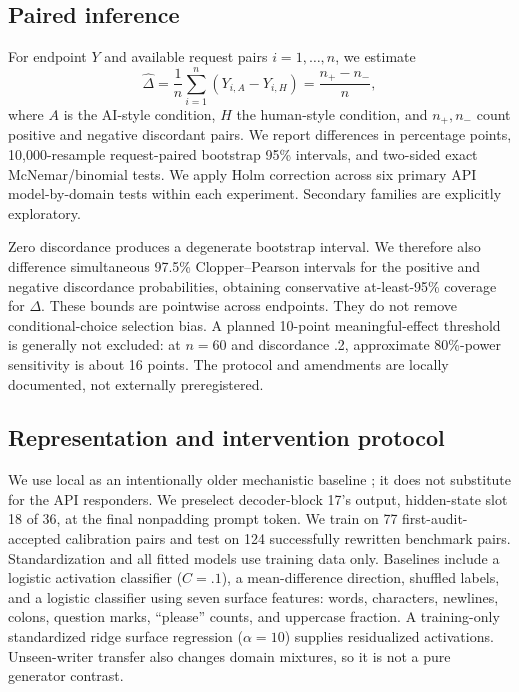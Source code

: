 \subsection{Paired inference}
For endpoint $Y$ and available request pairs $i=1,\ldots,n$, we estimate
\begin{equation}
\widehat{\Delta}=\frac{1}{n}\sum_{i=1}^{n}(Y_{i,A}-Y_{i,H})
=\frac{n_+-n_-}{n},
\label{eq:paired}
\end{equation}
where $A$ is the AI-style condition, $H$ the human-style condition, and $n_+,n_-$ count positive and negative discordant pairs. We report differences in percentage points, 10,000-resample request-paired bootstrap 95\% intervals, and two-sided exact McNemar/binomial tests. We apply Holm correction across six primary API model-by-domain tests within each experiment. Secondary families are explicitly exploratory.

Zero discordance produces a degenerate bootstrap interval. We therefore also difference simultaneous 97.5\% Clopper--Pearson intervals for the positive and negative discordance probabilities, obtaining conservative at-least-95\% coverage for $\Delta$. These bounds are pointwise across endpoints. They do not remove conditional-choice selection bias. A planned 10-point meaningful-effect threshold is generally not excluded: at $n=60$ and discordance .2, approximate 80\%-power sensitivity is about 16 points. The protocol and amendments are locally documented, not externally preregistered.

\subsection{Representation and intervention protocol}
We use local \qwenlocal as an intentionally older mechanistic baseline \cite{qwenmodel}; it does not substitute for the API responders. We preselect decoder-block 17's output, hidden-state slot 18 of 36, at the final nonpadding prompt token. We train on 77 first-audit-accepted calibration pairs and test on 124 successfully rewritten benchmark pairs. Standardization and all fitted models use training data only. Baselines include a logistic activation classifier ($C=.1$), a mean-difference direction, shuffled labels, and a logistic classifier using seven surface features: words, characters, newlines, colons, question marks, ``please'' counts, and uppercase fraction. A training-only standardized ridge surface regression ($\alpha=10$) supplies residualized activations. Unseen-writer transfer also changes domain mixtures, so it is not a pure generator contrast.

